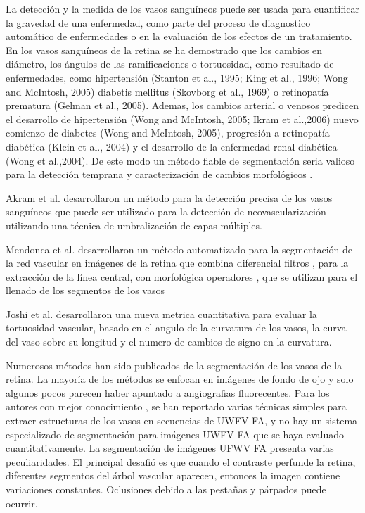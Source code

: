 La detección y la medida de los vasos sanguíneos puede ser usada para cuantificar la gravedad de una enfermedad, como parte del proceso de diagnostico automático de enfermedades o en la evaluación de los efectos de un tratamiento. En los vasos sanguíneos de la retina se ha demostrado que los cambios en diámetro, los ángulos de las ramificaciones o tortuosidad, como resultado de enfermedades, como hipertensión  (Stanton et al., 1995; King et al., 1996; Wong and McIntosh, 2005) diabetis mellitus (Skovborg et al., 1969) o retinopatía prematura (Gelman et al., 2005). Ademas, los cambios arterial o venosos predicen el desarrollo de hipertensión (Wong and McIntosh, 2005; Ikram et al.,2006) nuevo comienzo de diabetes (Wong and McIntosh, 2005), progresión a retinopatía diabética (Klein et al., 2004) y el desarrollo de la enfermedad renal diabética (Wong et al.,2004). De este modo un método fiable de segmentación seria valioso para la detección temprana y caracterización de cambios morfológicos . \cite{martinez2007segmentation} 	

Akram et al. \cite{akram2012automated} desarrollaron un método para la detección precisa de los vasos sanguíneos que puede ser utilizado para la detección de neovascularización utilizando una técnica de umbralización de capas múltiples.

Mendonca et al. \cite{mendonca2006segmentation} desarrollaron un método automatizado para la segmentación de la red vascular en imágenes de la retina que combina diferencial filtros , para la extracción de la línea central, con morfológica operadores , que se utilizan para el llenado de los segmentos de los vasos

Joshi et al. \cite{joshi2010automated} desarrollaron una nueva metrica cuantitativa para evaluar la tortuosidad vascular, basado en el angulo de la curvatura de los vasos, la curva del vaso sobre su longitud y el numero de cambios de signo en la curvatura.

Numerosos métodos han sido publicados de la segmentación de los vasos de la retina. La mayoría de los métodos se enfocan en imágenes de fondo de ojo y solo algunos pocos parecen haber apuntado a angiografias fluorecentes. Para los autores con mejor conocimiento , se han reportado varias técnicas simples para extraer estructuras de los vasos en secuencias de UWFV FA, y no hay un sistema especializado de segmentación para imágenes UWFV FA que se haya evaluado cuantitativamente.
La segmentación de imágenes UFWV FA presenta varias peculiaridades. El principal desafió es que cuando el contraste perfunde la retina, diferentes segmentos del árbol vascular aparecen, entonces la imagen contiene variaciones constantes. Oclusiones debido a las pestañas y párpados puede ocurrir.\cite{perez2011improving}

